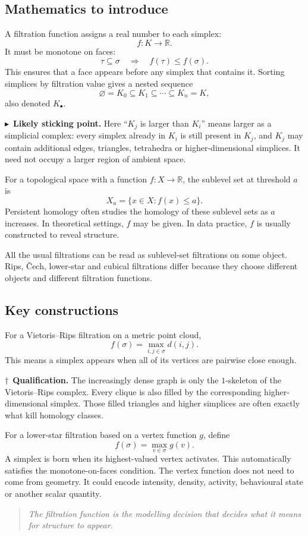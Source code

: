 \documentclass[11pt,a4paper]{article}
\newcommand{\planningbox}[2]{%
\subsection*{#1}
#2
}
\newcommand{\phrase}[1]{%
\begin{quote}
\emph{#1}
\end{quote}
}
\newcommand{\stickingpoint}[1]{%
\par\smallskip
\noindent\textcolor{red!65!black}{\(\blacktriangleright\)\ \textbf{Likely sticking point.}} #1
\par\smallskip
}
\newcommand{\qualification}[1]{%
\par\smallskip
\noindent\textcolor{blue!70!black}{\(\dagger\)\ \textbf{Qualification.}} #1
\par\smallskip
}
\begin{document}
\planningbox{Mathematics to introduce}{
A filtration function assigns a real number to each simplex:
\[
f:K\to\mathbb{R}.
\]
It must be monotone on faces:
\[
\tau\subseteq\sigma \quad\Longrightarrow\quad f(\tau)\leq f(\sigma).
\]
This ensures that a face appears before any simplex that contains it. Sorting
simplices by filtration value gives a nested sequence
\[
\varnothing=K_0\subseteq K_1\subseteq\cdots\subseteq K_n=K,
\]
also denoted \(K_\bullet\).

\stickingpoint{Here ``\(K_j\) is larger than \(K_i\)'' means larger as a
simplicial complex: every simplex already in \(K_i\) is still present in
\(K_j\), and \(K_j\) may contain additional edges, triangles, tetrahedra or
higher-dimensional simplices. It need not occupy a larger region of ambient
space.}

For a topological space with a function \(f:X\to\mathbb{R}\), the sublevel set
at threshold \(a\) is
\[
X_a=\{x\in X:f(x)\leq a\}.
\]
Persistent homology often studies the homology of these sublevel sets as
\(a\) increases. In theoretical settings, \(f\) may be given. In data practice,
\(f\) is usually constructed to reveal structure.

All the usual filtrations can be read as sublevel-set filtrations on some
object. Rips, \v{C}ech, lower-star and cubical filtrations differ because they
choose different objects and different filtration functions.
}

\planningbox{Key constructions}{
For a Vietoris--Rips filtration on a metric point cloud,
\[
f(\sigma)=\max_{i,j\in\sigma} d(i,j).
\]
This means a simplex appears when all of its vertices are pairwise close enough.

\qualification{The increasingly dense graph is only the \(1\)-skeleton of the
Vietoris--Rips complex. Every clique is also filled by the corresponding
higher-dimensional simplex. Those filled triangles and higher simplices are
often exactly what kill homology classes.}

For a lower-star filtration based on a vertex function \(g\), define
\[
f(\sigma)=\max_{v\in\sigma} g(v).
\]
A simplex is born when its highest-valued vertex activates. This automatically
satisfies the monotone-on-faces condition. The vertex function does not need to
come from geometry. It could encode intensity, density, activity, behavioural
state or another scalar quantity.
}

\phrase{The filtration function is the modelling decision that decides what it
means for structure to appear.}
\end{document}
